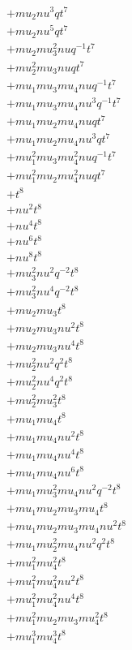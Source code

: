 \begin{align*}
  + mu_2 nu^{3} q t^{7} \\
  + mu_2 nu^{5} q t^{7} \\
  + mu_2 mu_3^{2} nu q^{-1} t^{7} \\
  + mu_2^{2} mu_3 nu q t^{7} \\
  + mu_1 mu_3 mu_4 nu q^{-1} t^{7} \\
  + mu_1 mu_3 mu_4 nu^{3} q^{-1} t^{7} \\
  + mu_1 mu_2 mu_4 nu q t^{7} \\
  + mu_1 mu_2 mu_4 nu^{3} q t^{7} \\
  + mu_1^{2} mu_3 mu_4^{2} nu q^{-1} t^{7} \\
  + mu_1^{2} mu_2 mu_4^{2} nu q t^{7} \\
  + t^{8} \\
  + nu^{2} t^{8} \\
  + nu^{4} t^{8} \\
  + nu^{6} t^{8} \\
  + nu^{8} t^{8} \\
  + mu_3^{2} nu^{2} q^{-2} t^{8} \\
  + mu_3^{2} nu^{4} q^{-2} t^{8} \\
  + mu_2 mu_3 t^{8} \\
  + mu_2 mu_3 nu^{2} t^{8} \\
  + mu_2 mu_3 nu^{4} t^{8} \\
  + mu_2^{2} nu^{2} q^{2} t^{8} \\
  + mu_2^{2} nu^{4} q^{2} t^{8} \\
  + mu_2^{2} mu_3^{2} t^{8} \\
  + mu_1 mu_4 t^{8} \\
  + mu_1 mu_4 nu^{2} t^{8} \\
  + mu_1 mu_4 nu^{4} t^{8} \\
  + mu_1 mu_4 nu^{6} t^{8} \\
  + mu_1 mu_3^{2} mu_4 nu^{2} q^{-2} t^{8} \\
  + mu_1 mu_2 mu_3 mu_4 t^{8} \\
  + mu_1 mu_2 mu_3 mu_4 nu^{2} t^{8} \\
  + mu_1 mu_2^{2} mu_4 nu^{2} q^{2} t^{8} \\
  + mu_1^{2} mu_4^{2} t^{8} \\
  + mu_1^{2} mu_4^{2} nu^{2} t^{8} \\
  + mu_1^{2} mu_4^{2} nu^{4} t^{8} \\
  + mu_1^{2} mu_2 mu_3 mu_4^{2} t^{8} \\
  + mu_1^{3} mu_4^{3} t^{8} \\

\end{align*}
